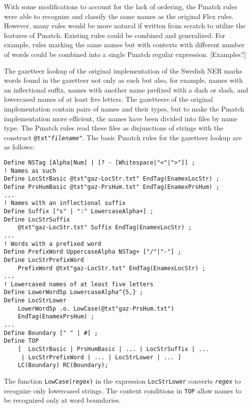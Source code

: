 \documentclass{llncs}
\begin{document}
With some modifications to account for the lack of ordering, the
Pmatch rules were able to recognize and classify the same names as the
original Flex rules. However, many rules would be more natural if
written from scratch to utilize the features of Pmatch. Existing rules
could be combined and generalized. For example, rules marking the same
names but with contexts with different number of words could be
combined into a single Pmatch regular expression. \textsf{[Examples?]}

The gazetteer lookup of the original implementation of the Swedish NER
marks words found in the gazetteer not only as such but also, for
example, names with an inflectional suffix, names with another name
prefixed with a dash or slash, and lowercased names of at least five
letters. The gazetteers of the original implementation contain pairs
of names and their types, but to make the Pmatch implementation more
efficient, the names have been divided into files by name type. The
Pmatch rules read these files as disjunctions of strings with the
construct \texttt{@txt"\textit{filename}"}. The basic Pmatch rules for
the gazetteer lookup are as follows:

\begin{verbatim}
Define NSTag [Alpha|Num] | [? - [Whitespace|"<"|">"]] ;
! Names as such
Define LocStrBasic @txt"gaz-LocStr.txt" EndTag(EnamexLocStr) ;
Define PrsHumBasic @txt"gaz-PrsHum.txt" EndTag(EnamexPrsHum) ;
...
! Names with an inflectional suffix
Define Suffix ["s" | ":" LowercaseAlpha+] ;
Define LocStrSuffix
    @txt"gaz-LocStr.txt" Suffix EndTag(EnamexLocStr) ;
...
! Words with a prefixed word
Define PrefixWord UppercaseAlpha NSTag+ ["/"|"-"] ;
Define LocStrPrefixWord 
    PrefixWord @txt"gaz-LocStr.txt" EndTag(EnamexLocStr) ;
...
! Lowercased names of at least five letters
Define LowerWord5p LowercaseAlpha^{5,} ;
Define LocStrLower
    LowerWord5p .o. LowCase(@txt"gaz-PrsHum.txt")
    EndTag(EnamexPrsHum) ;
...
Define Boundary [" " | #] ;
Define TOP
    [  LocStrBasic | PrsHumBasic | ... | LocStrSuffix | ... 
     | LocStrPrefixWord | ... | LocStrLower | ... ]
    LC(Boundary) RC(Boundary);
\end{verbatim}

\noindent
The function \texttt{LowCase(\textit{regex})} in the expression
\texttt{LocStrLower} converts \texttt{\textit{regex}} to recognize
only lowercased strings.
The context conditions in \texttt{TOP} allow names to be recognized
only at word boundaries.
\end{document}
